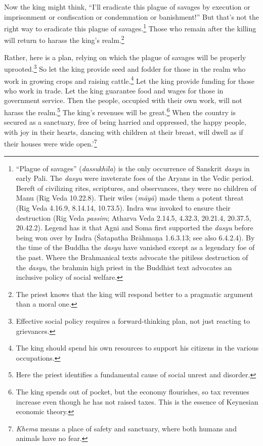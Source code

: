 \documentclass[12pt,openany]{book}%
\begin{document}
Now the king might think, “I’ll eradicate this plague of savages by execution or imprisonment or confiscation or condemnation or banishment!” But that’s not the right way to eradicate this plague of savages.\footnote{“Plague of savages” (\textit{\textsanskrit{dassukhīla}}) is the only occurrence of Sanskrit \textit{dasyu} in early Pali. The \textit{dasyu} were inveterate foes of the Aryans in the Vedic period. Bereft of civilizing rites, scriptures, and observances, they were no children of Manu (Rig Veda 10.22.8). Their wiles (\textit{\textsanskrit{māyā}}) made them a potent threat (Rig Veda 4.16.9, 8.14.14, 10.73.5). Indra was invoked to ensure their destruction (Rig Veda \emph{passim}; Atharva Veda 2.14.5, 4.32.3, 20.21.4, 20.37.5, 20.42.2). Legend has it that Agni and Soma first supported the \textit{dasyu} before being won over by Indra (Śatapatha \textsanskrit{Brāhmaṇa} 1.6.3.13; see also 6.4.2.4). By the time of the Buddha the \textit{dasyu} have vanished except as a legendary foe of the past. Where the Brahmanical texts advocate the pitiless destruction of the \textit{dasyu}, the brahmin high priest in the Buddhist text advocates an inclusive policy of social welfare. } Those who remain after the killing will return to harass the king’s realm.\footnote{The priest knows that the king will respond better to a pragmatic argument than a moral one. } 

Rather, here is a plan, relying on which the plague of savages will be properly uprooted.\footnote{Effective social policy requires a forward-thinking plan, not just reacting to grievances. } So let the king provide seed and fodder for those in the realm who work in growing crops and raising cattle.\footnote{The king should spend his own resources to support his citizens in the various occupations. } Let the king provide funding for those who work in trade. Let the king guarantee food and wages for those in government service. Then the people, occupied with their own work, will not harass the realm.\footnote{Here the priest identifies a fundamental cause of social unrest and disorder. } The king’s revenues will be great.\footnote{The king spends out of pocket, but the economy flourishes, so tax revenues increase even though he has not raised taxes. This is the essence of Keynesian economic theory. } When the country is secured as a sanctuary, free of being harried and oppressed, the happy people, with joy in their hearts, dancing with children at their breast, will dwell as if their houses were wide open.’\footnote{\textit{Khema} means a place of safety and sanctuary, where both humans and animals have no fear. } 
\end{document}
